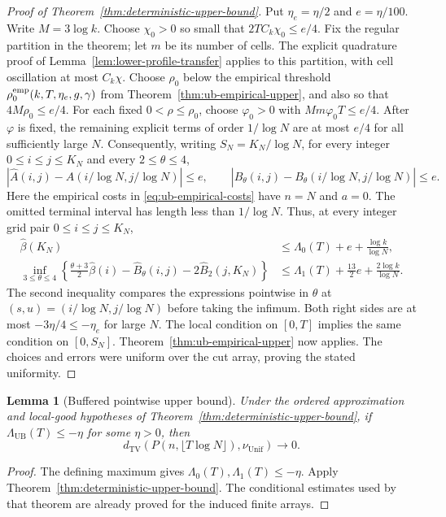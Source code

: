 \documentclass[11pt]{article}
\numberwithin{equation}{section}
\newtheorem{lemma}[lemma]{Lemma}
\newcommand{\TV}{\mathrm{TV}}
\newcommand{\Unif}{\mathrm{Unif}}
\newcommand{\1}{\mathbf 1}
\newcommand{\nuUnif}{\nu_{\Unif}}
\newcommand{\UB}{\mathrm{UB}}
\begin{document}
\begin{proof}[Proof of Theorem~\ref{thm:deterministic-upper-bound}]
Put $\eta_e=\eta/2$ and $e=\eta/100$.
Write $M=3\log k$.  Choose $\chi_0>0$ so small that
$2TC_k\chi_0\le e/4$.  Fix the regular partition in the theorem;
let $m$ be its number of cells.  The explicit quadrature proof of
Lemma~\ref{lem:lower-profile-transfer} applies to this partition,
with cell oscillation at most $C_k\chi$.
Choose $\rho_0$ below the empirical threshold
$\rho_0^{\rm emp}(k,T,\eta_e,g,\gamma)$ from
Theorem~\ref{thm:ub-empirical-upper}, and also so that
$4M\rho_0\le e/4$.  For each fixed $0<\rho\le\rho_0$, choose
$\varphi_0>0$ with $Mm\varphi_0T\le e/4$.
After $\varphi$ is fixed, the remaining explicit terms of order
$1/\log N$ are at most $e/4$ for all sufficiently large $N$.
Consequently, writing $S_N=K_N/\log N$, for every integer
$0\le i\le j\le K_N$ and every $2\le\theta\le4$,
\[
 |\widehat A(i,j)-A(i/\log N,j/\log N)|\le e,
 \qquad
 |\widehat B_\theta(i,j)-B_\theta(i/\log N,j/\log N)|\le e.
\]
Here the empirical costs in \eqref{eq:ub-empirical-costs} have
$n=N$ and $a=0$.
The omitted terminal interval has length less than $1/\log N$.
Thus, at every integer grid pair $0\le i\le j\le K_N$,
\begin{align*}
 \widehat\beta(K_N)
 &\le\Lambda_0(T)+e+\frac{\log k}{\log N},\\
 \inf_{3\le\theta\le4}
 \left\{\frac{\theta+3}{2}\widehat\beta(i)
     -\widehat B_\theta(i,j)-2\widehat B_2(j,K_N)\right\}
 &\le\Lambda_1(T)+\frac{13}{2}e
                         +\frac{2\log k}{\log N}.
\end{align*}
The second inequality compares the expressions pointwise in $\theta$
at $(s,u)=(i/\log N,j/\log N)$ before taking the infimum.
Both right sides are at most $-3\eta/4\le-\eta_e$ for large $N$.
The local condition on $[0,T]$ implies the same condition on $[0,S_N]$.
Theorem~\ref{thm:ub-empirical-upper} now applies.  The choices and
errors were uniform over the cut array, proving the stated uniformity.
\end{proof}

\begin{lemma}[Buffered pointwise upper bound]
\label{lem:buffered-pointwise-upper-bound}
Under the ordered approximation and local-good hypotheses of
Theorem~\ref{thm:deterministic-upper-bound}, if
$\Lambda_{\UB}(T)\le-\eta$ for some $\eta>0$, then
\[
 d_{\TV}(P(n,\lfloor T\log N\rfloor),\nuUnif)\longrightarrow0.
\]
\end{lemma}
\begin{proof}
The defining maximum gives $\Lambda_0(T),\Lambda_1(T)\le-\eta$.
Apply Theorem~\ref{thm:deterministic-upper-bound}.  The conditional estimates used by that theorem are already
proved for the induced finite arrays.
\end{proof}
\end{document}
